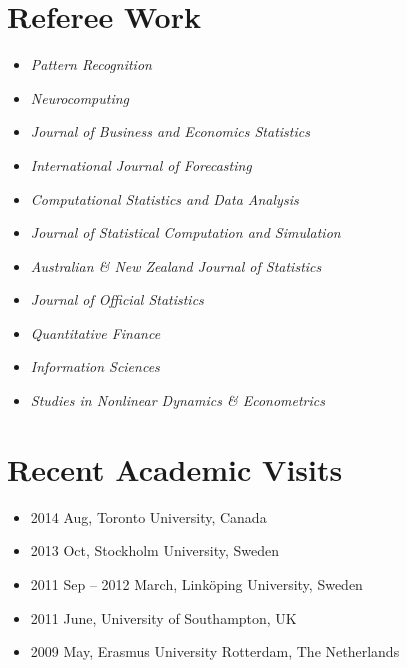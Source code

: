 \documentclass[twoside,a4paper,10pt]{amsart}
\begin{document}
\section*{Referee Work}
\begin{itemize}
\item \emph{Pattern Recognition}
\item \emph{Neurocomputing}
\item  \emph{Journal of Business and Economics Statistics}
\item  \emph{International Journal of Forecasting}
\item  \emph{Computational Statistics and Data Analysis}
\item  \emph{Journal of Statistical Computation and Simulation}
\item  \emph{Australian \& New Zealand Journal of Statistics}
\item  \emph{Journal of Official Statistics}
\item  \emph{Quantitative Finance}
\item  \emph{Information Sciences}
\item  \emph{Studies in Nonlinear Dynamics \& Econometrics}

\end{itemize}


\section*{Recent Academic Visits}

\begin{itemize}
\item 2014 Aug, Toronto University, Canada
\item 2013 Oct, Stockholm University, Sweden
\item 2011 Sep – 2012 March, Linköping University, Sweden
\item 2011 June, University of Southampton, UK
\item 2009 May, Erasmus University Rotterdam, The Netherlands
\end{itemize}





\end{document}
